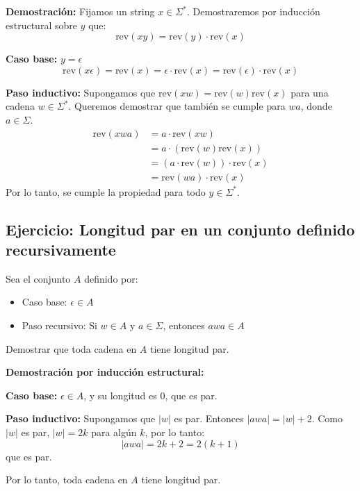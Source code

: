 \textbf{Demostración:} Fijamos un string $x \in \Sigma^*$. Demostraremos por inducción estructural sobre $y$ que:
\[
    \text{rev}(xy) = \text{rev}(y) \cdot \text{rev}(x)
\]

\textbf{Caso base:} $y = \epsilon$
\[
    \text{rev}(x\epsilon) = \text{rev}(x) = \epsilon \cdot \text{rev}(x) = \text{rev}(\epsilon) \cdot \text{rev}(x)
\]

\textbf{Paso inductivo:} Supongamos que $\text{rev}(xw) = \text{rev}(w)\text{rev}(x)$ para una cadena $w \in \Sigma^*$. Queremos demostrar que también se cumple para $wa$, donde $a \in \Sigma$.
\begin{align*}
\text{rev}(xwa) &= a \cdot \text{rev}(xw) \\
                &= a \cdot (\text{rev}(w)\text{rev}(x)) \\
                &= (a \cdot \text{rev}(w)) \cdot \text{rev}(x) \\
                &= \text{rev}(wa) \cdot \text{rev}(x)
\end{align*}
Por lo tanto, se cumple la propiedad para todo $y \in \Sigma^*$.

\subsection{Ejercicio: Longitud par en un conjunto definido recursivamente}

Sea el conjunto $A$ definido por:
\begin{itemize}
    \item Caso base: $\epsilon \in A$
    \item Paso recursivo: Si $w \in A$ y $a \in \Sigma$, entonces $awa \in A$
\end{itemize}

Demostrar que toda cadena en $A$ tiene longitud par.

\textbf{Demostración por inducción estructural:}

\textbf{Caso base:} $\epsilon \in A$, y su longitud es $0$, que es par.

\textbf{Paso inductivo:} Supongamos que $|w|$ es par. Entonces $|awa| = |w| + 2$. Como $|w|$ es par, $|w| = 2k$ para algún $k$, por lo tanto:
\[
    |awa| = 2k + 2 = 2(k + 1)
\]
que es par.

Por lo tanto, toda cadena en $A$ tiene longitud par.